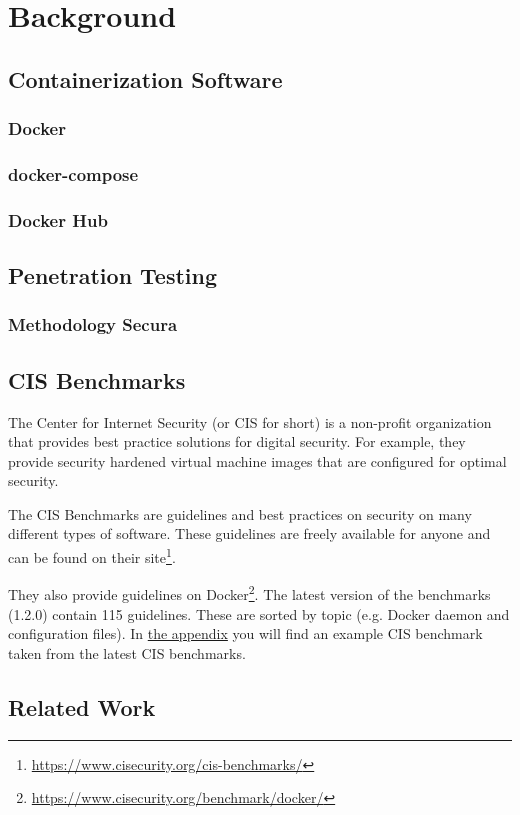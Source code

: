 \chapter{Background}

\section{Containerization Software}
\subsection{Docker}
\subsection{docker-compose}
\subsection{Docker Hub}
\section{Penetration Testing}
\subsection{Methodology Secura}

\section{CIS Benchmarks}
The Center for Internet Security (or CIS for short) is a non-profit organization that provides best practice solutions for digital security. For example, they provide security hardened virtual machine images that are configured for optimal security.

\hfill

The CIS Benchmarks are guidelines and best practices on security on many different types of software. These guidelines are freely available for anyone and can be found on their site\footnote{\url{https://www.cisecurity.org/cis-benchmarks/}}.

\hfill

They also provide guidelines on Docker\footnote{\url{https://www.cisecurity.org/benchmark/docker/}}. The latest version of the benchmarks (1.2.0) contain 115 guidelines. These are sorted by topic (e.g. Docker daemon and configuration files). In \hyperref[appendix:a]{the appendix} you will find an example CIS benchmark taken from the latest CIS benchmarks.

\section{Related Work}

